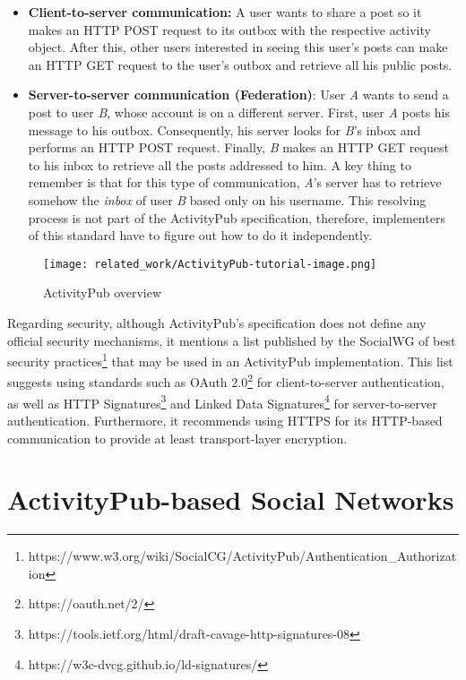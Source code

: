 \begin{itemize}
  \item \textbf{Client-to-server communication:} A user wants to share a post so it makes an HTTP POST request to its outbox with the respective activity object. After this, other users interested in seeing this user's posts can make an HTTP GET request to the user's outbox and retrieve all his public posts.
  \item \textbf{Server-to-server communication (Federation)}: User \emph{A} wants to send a post to user \emph{B}, whose account is on a different server. First, user \emph{A} posts his message to his outbox. Consequently, his server looks for \emph{B}'s inbox and performs an HTTP POST request. Finally, \emph{B} makes an HTTP GET request to his inbox to retrieve all the posts addressed to him. A key thing to remember is that for this type of communication, \emph{A}'s server has to retrieve somehow the \emph{inbox} of user \emph{B} based only on his username. This resolving process is not part of the ActivityPub specification, therefore,  implementers of this standard have to figure out how to do it independently. 
\end{itemize}
 

\begin{figure}[H]
  \centering
  \texttt{[image: related\_work/ActivityPub-tutorial-image.png]}
  \caption{ActivityPub overview \cite{lemmer-webber_tallon_guy_prodromou_2018}}
  \label{fig:ap_flow}
\end{figure}
\pagebreak

Regarding security, although ActivityPub's specification does not define any official security mechanisms, it mentions a list published by the SocialWG of best security practices\footnote{https://www.w3.org/wiki/SocialCG/ActivityPub/Authentication\_Authorization} that may be used in an ActivityPub implementation. This list suggests using standards such as OAuth 2.0\footnote{https://oauth.net/2/} for client-to-server authentication, as well as HTTP Signatures\footnote{https://tools.ietf.org/html/draft-cavage-http-signatures-08} and Linked Data Signatures\footnote{https://w3c-dvcg.github.io/ld-signatures/} for server-to-server authentication. Furthermore, it recommends using HTTPS for its HTTP-based communication to provide at least transport-layer encryption.


\section{ActivityPub-based Social Networks}

